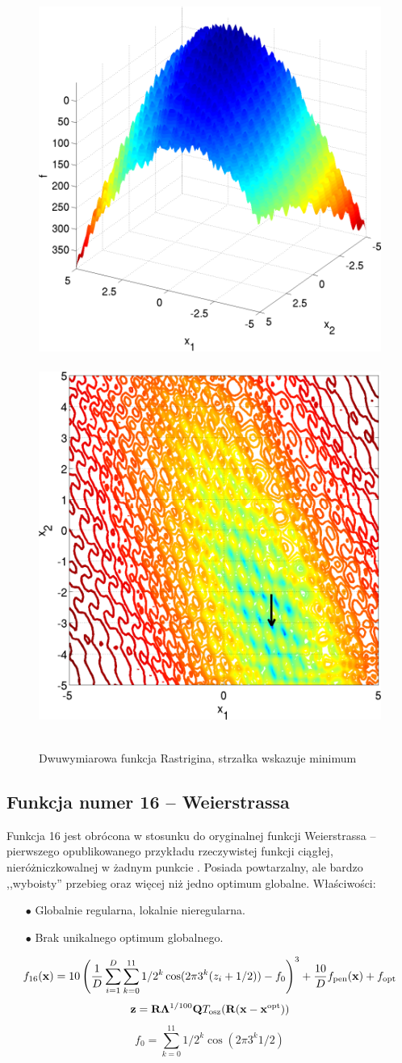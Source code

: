 \documentclass[a4paper,onecolumn,oneside,12pt,wide,floatssmall]{mwrep}
\theoremstyle{definition}
\theoremstyle{plain}%
\theoremstyle{remark}
\begin{document}
\begin{figure}[H]
\centering
\mbox{
\includegraphics[width=.45\textwidth]{img/15.png} \quad
\includegraphics[width=.45\textwidth]{img/15a.png} 
}
\caption{Dwuwymiarowa funkcja Rastrigina, strzałka wskazuje minimum \cite{noiseless}}
\end{figure}

\subsection{Funkcja numer 16 -- Weierstrassa}

Funkcja 16 jest obrócona w stosunku do oryginalnej funkcji Weierstrassa -- pierwszego opublikowanego przykładu
rzeczywistej funkcji ciągłej, nieróżniczkowalnej w żadnym punkcie \cite{szarek}.
Posiada powtarzalny, ale bardzo ,,wyboisty'' przebieg oraz więcej niż jedno optimum globalne. Właściwości:
\begin{itemize}
 \item[$\bullet$] Globalnie regularna, lokalnie nieregularna.
 \item[$\bullet$] Brak unikalnego optimum globalnego.
\end{itemize} 

$$ f_{16}(\bold{x}) = 10 \left( \frac{1}{D} \sum^D_{i=1} \sum^{11}_{k=0} 1 / 2^k \cos(2 \pi 3^k(z_i + 1/2)) - f_0 \right)^3 + \frac{10}{D} f_\text{pen}(\bold{x}) + f_\text{opt} $$
$$ \bold{z} = \bold{R} \bold{\Lambda}^{1/100} \bold{Q} T_\text{osz}(\bold{R}(\bold{x} - \bold{x}^\text{opt})) $$
$$ f_0 = \sum^{11}_{k=0} 1/2^k \cos(2 \pi 3^k 1/2) $$
\end{document}
